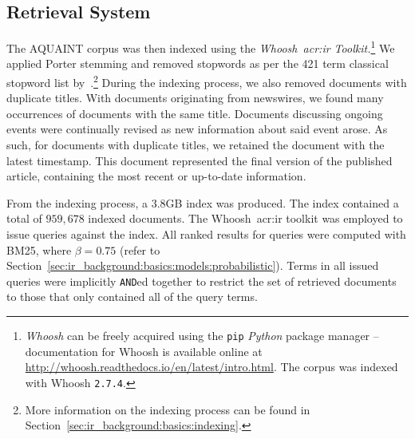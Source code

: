 \begin{figure}[h]
    \centering
    \vspace{6mm}
    \vspace{-9mm}
    \label{fig:aquaint_stats}
\end{figure}

\subsection{Retrieval System}\label{sec:methodology:collection:system}
The AQUAINT corpus was then indexed using the \emph{Whoosh~\gls{acr:ir} Toolkit.}\footnote{\emph{Whoosh} can be freely acquired using the \texttt{pip} \emph{Python} package manager -- documentation for Whoosh is available online at \url{http://whoosh.readthedocs.io/en/latest/intro.html}.  The corpus was indexed with Whoosh \texttt{2.7.4}.} We applied Porter stemming and removed stopwords as per the 421 term classical stopword list by~\cite{fox1992stopwords}.\footnote{More information on the indexing process can be found in Section~\ref{sec:ir_background:basics:indexing}.} During the indexing process, we also removed documents with duplicate titles. With documents originating from newswires, we found many occurrences of documents with the same title. Documents discussing ongoing events were continually revised as new information about said event arose. As such, for documents with duplicate titles, we retained the document with the latest timestamp. This document represented the final version of the published article, containing the most recent or up-to-date information.

From the indexing process, a $3.8$GB index was produced. The index contained a total of $959,678$ indexed documents. The Whoosh~\gls{acr:ir} toolkit was employed to issue queries against the index. All ranked results for queries were computed with BM25, where $\beta=0.75$ (refer to Section~\ref{sec:ir_background:basics:models:probabilistic}). Terms in all issued queries were implicitly \texttt{AND}ed together to restrict the set of retrieved documents to those that only contained all of the query terms.

